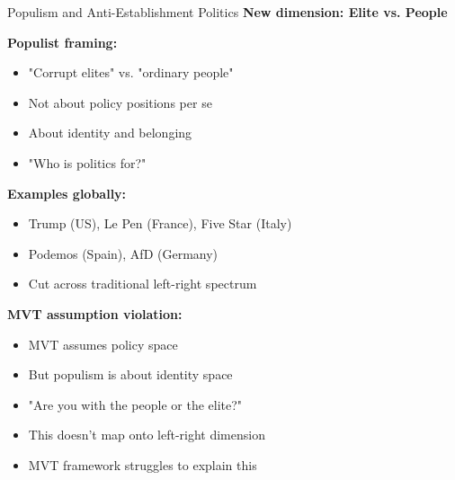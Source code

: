 \documentclass[10pt]{beamer}
\begin{document}
\begin{frame}{Populism and Anti-Establishment Politics}
\textbf{New dimension: Elite vs. People}



\textbf{Populist framing:}
\begin{itemize}
\item "Corrupt elites" vs. "ordinary people"
\item Not about policy positions per se
\item About identity and belonging
\item "Who is politics for?"
\end{itemize}



\textbf{Examples globally:}
\begin{itemize}
\item Trump (US), Le Pen (France), Five Star (Italy)
\item Podemos (Spain), AfD (Germany)
\item Cut across traditional left-right spectrum
\end{itemize}



\textbf{MVT assumption violation:}
\begin{itemize}
\item MVT assumes policy space
\item But populism is about \alert{identity space}
\item "Are you with the people or the elite?"
\item This doesn't map onto left-right dimension
\item \alert{MVT framework struggles to explain this}
\end{itemize}
\end{frame}
\end{document}
